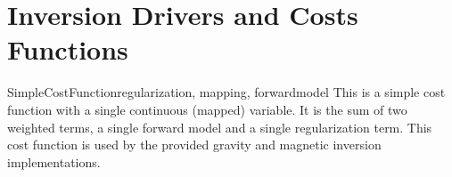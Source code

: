 
\chapter{Inversion Drivers and Costs Functions}\label{chapter:ref:Drivers}

\begin{classdesc}{SimpleCostFunction}{regularization, mapping, forwardmodel}
    This is a simple cost function with a single continuous (mapped) variable.
    It is the sum of two weighted terms, a single forward model and a single
    regularization term. This cost function is used by the provided gravity
    and magnetic inversion implementations.
\end{classdesc}
